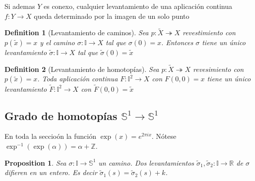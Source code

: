 \documentclass{myclass}
\newtheorem*{definition}{Definition}
\newtheorem*{proposition}{Proposition}
\begin{document}
Si ademas $Y$ es conexo, cualquier levantamiento de una aplicación continua $f: Y \to X$ queda determinado por la imagen de un solo punto

\begin{minipage}{0.8\textwidth}
\begin{definition}[Levantamiento de caminos] Sea $p:\tilde{X} \twoheadrightarrow X$ revestimiento con $p(\tilde{x})=x$ y el camino $\sigma : \mathbb{I} \to X$ tal que $\sigma (0) = x$. Entonces $\sigma $ tiene un único levantamiento $\tilde{\sigma }: \mathbb{I} \to  X$ tal que  $\tilde{\sigma}(0) = \tilde{x}$
\end{definition}
\end{minipage}
\begin{minipage}{0.2\textwidth}
\end{minipage}

\begin{definition}[Levantamiento de homotopías] Sea $p:\tilde{X} \twoheadrightarrow X$ revesimiento con $p(\tilde{x})=x$. Toda aplicación continua $F:\mathbb{I}^2 \to X$ con $F(0, 0) = x$ tiene un único levantamiento  $\tilde{F}: \mathbb{I}^2 \to  X$ con $\tilde{F}(0, 0) = \tilde{x}$
\end{definition}

\subsection{Grado de homotopías $\mathbb{S}^1 \to \mathbb{S}^1$}
En toda la seccioón la función $\exp(x) = e^{2\pi i x}$. Nótese $\exp^{-1}(\exp(\alpha )) = \alpha + \mathbb{Z}$.

\begin{proposition}
Sea $\sigma : \mathbb{I} \to \mathbb{S}^1$ un camino. Dos levantamientos $\tilde{\sigma }_1, \tilde{\sigma }_2: \mathbb{I} \to  \mathbb{R}$ de $\sigma $ difieren en un entero. Es decir $\tilde{\sigma }_1(s) = \tilde{\sigma }_2(s) + k$.
\end{proposition}
\end{document}
